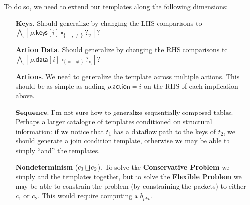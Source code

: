 \documentclass{article}
\newcommand{\action}{\mathsf{action}}
\newcommand{\keys}{\mathsf{keys}}
\newcommand{\data}{\mathsf{data}}
\newcommand{\choiceop}{\rotatebox[origin=c]{90}{$\sqsubset\!\!\!\sqsupset$}}
\newcommand{\choice}{\mathbin{\choiceop}}
\begin{document}
To do so, we need to extend our templates along the following dimensions:
\begin{enumerate}[align=left]
\item[\textbf{Keys}.] Should generalize by changing the LHS comparisons to $
  \bigwedge_i[\rho.\keys[i]~\square_{\{=,\neq\}}~?_{v_i}]?$
\item[\textbf{Action Data}.] Should generalize by changing the RHS comparisons to $\bigwedge_i[\rho.\data[i]~\square_{\{=,\neq\}}~?_{v_i}]?$
\item[\textbf{Actions}.] We need to generalize the template across multiple actions. This should be as simple as adding $\rho.\action = i$ on the RHS of each implication above.
\item[\textbf{Sequence}.] I'm not sure how to generalize sequentially composed tables.
  Perhaps a larger catalogue of templates conditioned on structural information:
  if we notice that $t_1$ has a dataflow path to the keys of $t_2$, we should
  generate a join condition template, otherwise we may be able to simply ``and'' the templates.

\item[\textbf{Nondeterminism} ($c_1 \choice c_2$).] To solve the \textbf{Conservative
  Problem} we simply and the templates together, but to solve the
  \textbf{Flexible Problem} we may be able to constrain the problem (by
  constraining the packets) to either $c_1$ or $c_2$. This would require
  computing a $b_{\textit{pkt}}$.
\end{enumerate}
\end{document}
